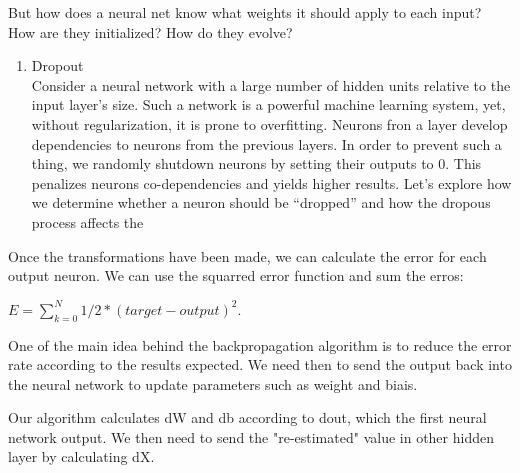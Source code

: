 

But how does a neural net know what weights it should apply to each input?
How are they initialized?
How do they evolve?
   
\begin{enumerate}    

   \item Dropout\\
     Consider a neural network with a large number of hidden units relative to the input layer's size.
     Such a network is a powerful machine learning system, yet, without regularization, it is prone to overfitting.
     Neurons fron a layer develop dependencies to neurons from the previous layers.
     In order to prevent such a thing, we randomly shutdown neurons by setting their outputs to 0.
     This penalizes neurons co-dependencies and yields higher results.
     Let's explore how we determine whether a neuron should be ``dropped'' and how the dropous process affects the 

\end{enumerate}
Once the transformations have been made, we can calculate the error for each output neuron. We can use the squarred error function and sum the erros:

$E = \sum_{k=0}^{N} 1/2*(target - output)^2$.

One of the main idea behind the backpropagation algorithm is to reduce the error rate according to the results expected. We need then to send the output back into the neural network to update parameters such as weight and biais. 

Our algorithm calculates dW and db according to dout, which the first neural network output.
We then need to send the "re-estimated" value in other hidden layer by calculating dX.


